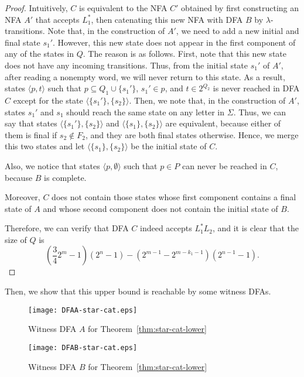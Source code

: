\documentclass[10pt]{article}
\begin{document}
\begin{proof}
    Intuitively, $C$ is equivalent to the NFA $C'$ obtained by first constructing an NFA $A'$ that accepts $L_1^*$, then catenating this new NFA with DFA $B$ by $\lambda$-transitions.
    Note that, in the construction of $A'$, we need to add a new initial and final state $s_1'$.
    However, this new state does not appear in the first component of any of the states in $Q$.
    The reason is as follows.
    First, note that this new state does not have any incoming transitions.
    Thus, from the initial state $s_1'$ of $A'$, after reading a nonempty word, we will never return to this state.
    As a result, states $\langle p, t \rangle$ such that $p \subseteq Q_1 \cup \{s_1'\}$, $ s_1' \in p$, and $t \in 2^{Q_2}$ is never reached in DFA $C$ except for the state $\langle\{s_1'\}, \{s_2\}\rangle$.
    Then, we note that, in the construction of $A'$, states $s_1'$ and $s_1$ should reach the same state on any letter in $\Sigma$.
    Thus, we can say that states $\langle \{s_1'\}, \{s_2\}\rangle$ and $\langle \{s_1\}, \{s_2\} \rangle$ are equivalent, because either of them is final if $s_2 \not\in F_2$, and they are both final states otherwise.
    Hence, we merge this two states and let $\langle \{s_1\}, \{s_2\} \rangle$ be the initial state of $C$.

    Also, we notice that states $\langle p, \emptyset \rangle$ such that $p \in P $ can never be reached in $C$, because $B$ is complete.

    Moreover, $C$ does not contain those states whose first component contains a final state of $A$ and whose second component does not contain the initial state of $B$.

    Therefore, we can verify that DFA $C$ indeed accepts $L_1^* L_2$, and it is clear that the size of $Q$ is
 \[
    (\dfrac{3}{4}2^m - 1)(2^n-1) - (2^{m-1}-2^{m-k_1-1})(2^{n-1}-1).
 \]
\end{proof}

Then, we show that this upper bound is reachable by some witness DFAs.

\begin{figure}[ht]
  \begin{center}
  \texttt{[image: DFAA-star-cat.eps]}
  \end{center}
  \caption{Witness DFA $A$ for Theorem~\ref{thm:star-cat-lower}}
\label{fig:DFAA-star-cat}
\end{figure}

\begin{figure}[ht]
  \begin{center}
  \texttt{[image: DFAB-star-cat.eps]}
  \end{center}
  \caption{Witness DFA $B$ for Theorem~\ref{thm:star-cat-lower}}
\label{fig:DFAB-star-cat}
\end{figure}
\end{document}
